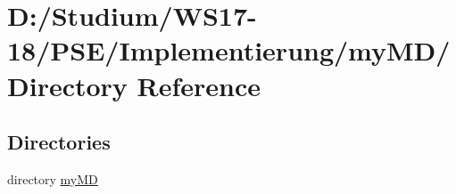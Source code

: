\hypertarget{dir_D_3A_2FStudium_2FWS17_2D18_2FPSE_2FImplementierung_2FmyMD_2F}{
\section{D:/Studium/WS17-18/PSE/Implementierung/my\-MD/ Directory Reference}
\label{dir_D_3A_2FStudium_2FWS17_2D18_2FPSE_2FImplementierung_2FmyMD_2F}
}


\subsection*{Directories}
\begin{CompactItemize}
\item 
directory \hyperlink{dir_D_3A_2FStudium_2FWS17_2D18_2FPSE_2FImplementierung_2FmyMD_2FmyMD_2F}{my\-MD}
\end{CompactItemize}
